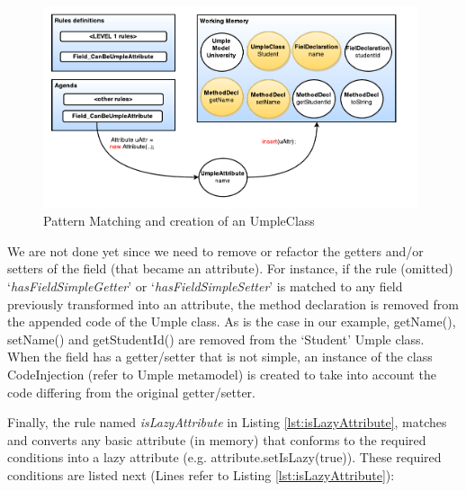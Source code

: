 \begin{figure}[h]
\centering
\includegraphics[width=0.98\textwidth]{Figures/ruleModel3.pdf}
\caption{Pattern Matching and creation of an UmpleClass}
\label{fig:ruleModel3}
\end{figure}

We are not done yet since we need to remove or refactor the getters  and/or setters of the field (that became an attribute). For instance, if the rule (omitted) `\textit{hasFieldSimpleGetter}' or `\textit{hasFieldSimpleSetter}' is matched to any field previously transformed into an attribute, the method declaration is removed from the appended code of the Umple class. As is the case in our example, getName(), setName() and getStudentId() are removed from the `Student' Umple class.
When the field has a getter/setter that is not simple, an instance of the class CodeInjection (refer to Umple metamodel) is created to take into account the code differing from the original getter/setter.

Finally, the rule named \textit{isLazyAttribute} in Listing \ref{lst:isLazyAttribute},  matches and converts any basic attribute (in memory) that conforms to the required conditions into a lazy attribute (e.g. attribute.setIsLazy(true)). These required conditions are listed next (Lines refer to Listing \ref{lst:isLazyAttribute}): 

